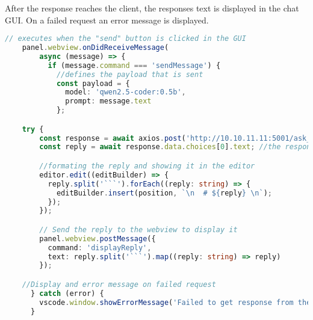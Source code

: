 After the response reaches the client, the responses text is displayed in the chat GUI.
On a failed request an error message is displayed.

\begin{lstlisting}[language=TypeScript, caption={Axios request}]
    // executes when the "send" button is clicked in the GUI
    panel.webview.onDidReceiveMessage(
        async (message) => {
          if (message.command === 'sendMessage') {
            //defines the payload that is sent
            const payload = {
              model: 'qwen2.5-coder:0.5b',
              prompt: message.text
            };  

    try {
        const response = await axios.post('http://10.10.11.11:5001/ask_programming_bot', payload ); //Selecting the endpoint for the request and sending the payload. 
        const reply = await response.data.choices[0].text; //the response is then stored in the "reply" variable

        //formating the reply and showing it in the editor
        editor.edit((editBuilder) => {
          reply.split('```').forEach((reply: string) => {
            editBuilder.insert(position, `\n  # ${reply} \n`);
          });
        });

        // Send the reply to the webview to display it
        panel.webview.postMessage({
          command: 'displayReply',
          text: reply.split('```').map((reply: string) => reply)
        });

    //Display and error message on failed request
      } catch (error) {
        vscode.window.showErrorMessage('Failed to get response from the server.');
      }

\end{lstlisting}


